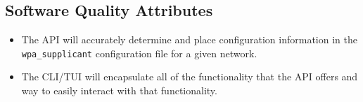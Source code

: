 \subsection{Software Quality Attributes}
\begin{itemize}
  \item The API will accurately determine and place configuration information
    in the \texttt{wpa\_supplicant} configuration file for a given network.
  \item The CLI/TUI will encapsulate all of the functionality that the API
    offers and way to easily interact with that functionality.
\end{itemize}
